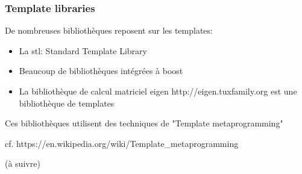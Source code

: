 \documentclass{beamer}
\begin{document}
\begin{frame}
\frametitle {Template libraries}
De nombreuses bibliothèques reposent sur les templates:
\begin{itemize}
\item{La stl: Standard Template Library}
\item{Beaucoup de bibliothèques intégrées à boost}
\item{La bibliothèque de calcul matriciel eigen http://eigen.tuxfamily.org est une bibliothèque de templates}
\end{itemize}
Ces bibliothèques utilisent des techniques de "Template metaprogramming"

cf. https://en.wikipedia.org/wiki/Template\_metaprogramming

\end{frame}

\begin{frame}
(à suivre)
\end{frame}
\end{document}
